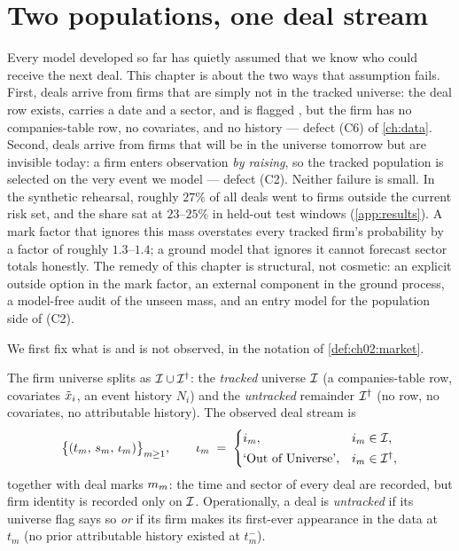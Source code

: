 
\section{Two populations, one deal stream}\label{ch11:sec:populations}

Every model developed so far has quietly assumed that we know who could
receive the next deal. This chapter is about the two ways that assumption
fails. First, deals arrive from firms that are simply not in the tracked
universe: the deal row exists, carries a date and a sector, and is flagged
, but the firm has no
companies-table row, no covariates, and no history --- defect (C6) of
\cref{ch:data}. Second, deals arrive from firms that will be in the
universe tomorrow but are invisible today: a firm enters observation
\emph{by raising}, so the tracked population is selected on the very event
we model --- defect (C2). Neither failure is small. In the synthetic
rehearsal, roughly $27\%$ of all deals went to firms outside the current
risk set, and the share sat at $23$--$25\%$ in held-out test windows
(\cref{app:results}). A mark factor that ignores this mass overstates
every tracked firm's probability by a factor of roughly $1.3$--$1.4$; a
ground model that ignores it cannot forecast sector totals honestly. The
remedy of this chapter is structural, not cosmetic: an explicit outside
option in the mark factor, an external component in the ground process, a
model-free audit of the unseen mass, and an entry model for the population
side of (C2).

We first fix what is and is not observed, in the notation of
\cref{def:ch02:market}.

\begin{definition}\label{def:ch11:universes}
The firm universe splits as $\mathcal{I} \cup \mathcal{I}^{\dagger}$: the
\emph{tracked} universe $\mathcal{I}$ (a companies-table row, covariates
$\tilde{x}_i$, an event history $N_i$) and the \emph{untracked}
remainder $\mathcal{I}^{\dagger}$ (no row, no covariates, no attributable
history). The observed deal stream is
\begin{equation}\label{eq:ch11:observed}
\big\{(t_m,\, s_m,\, \iota_m)\big\}_{m\ge 1},
\qquad
\iota_m \;=\;
\begin{cases}
i_m, & i_m \in \mathcal{I},\\[2pt]
\text{`Out of Universe'}, & i_m \in \mathcal{I}^{\dagger},
\end{cases}
\end{equation}
together with deal marks $m_m$: the time and sector of every deal are
recorded, but firm identity is recorded only on $\mathcal{I}$. Operationally, a
deal is \emph{untracked} if its universe flag says so \emph{or} if its
firm makes its first-ever appearance in the data at $t_m$ (no prior
attributable history existed at $t_m^-$).
\end{definition}

